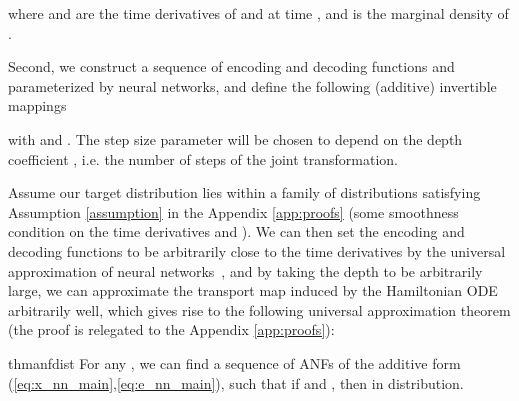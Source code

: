 \documentclass{article}
\begin{document}
where  and  are the time derivatives of  and  at time , and  is the marginal density of . 

Second, we construct a sequence of encoding and decoding functions  and  parameterized by neural networks, and define the following (additive) invertible mappings

with  and . 
The step size parameter  will be chosen to depend on the depth coefficient , i.e. the number of steps of the joint transformation. 

Assume our target distribution lies within a family of distributions  satisfying Assumption \ref{assumption} in the Appendix \ref{app:proofs} (some smoothness condition on the time derivatives and ). 
We can then set the encoding and decoding functions to be arbitrarily close to the time derivatives by the universal approximation of neural networks~\citep{cybenko1989approximation}, and by taking the depth  to be arbitrarily large, we can approximate the transport map induced by the Hamiltonian ODE arbitrarily well, which gives rise to the following universal approximation theorem (the proof is relegated to the Appendix \ref{app:proofs}):
\begin{restatable}{thm}{anfdist}
\label{thm:anf_dist}
For any , we can find a sequence  of ANFs of the additive form (\ref{eq:x_nn_main},\ref{eq:e_nn_main}), such that if  and , then  in distribution. 
\end{restatable}
\end{document}
